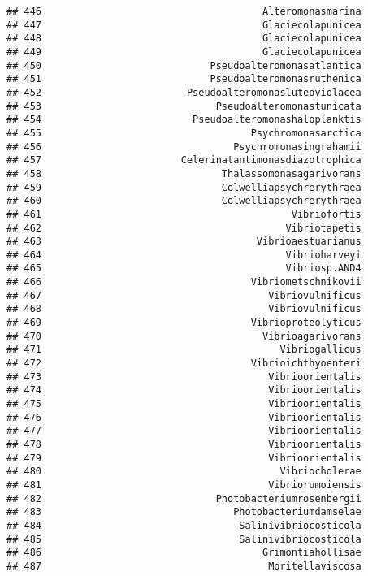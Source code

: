 \documentclass[
]{article}
\begin{document}
\begin{verbatim}
## 446                                      Alteromonasmarina
## 447                                      Glaciecolapunicea
## 448                                      Glaciecolapunicea
## 449                                      Glaciecolapunicea
## 450                             Pseudoalteromonasatlantica
## 451                             Pseudoalteromonasruthenica
## 452                         Pseudoalteromonasluteoviolacea
## 453                              Pseudoalteromonastunicata
## 454                          Pseudoalteromonashaloplanktis
## 455                                    Psychromonasarctica
## 456                                 Psychromonasingrahamii
## 457                        Celerinatantimonasdiazotrophica
## 458                               Thalassomonasagarivorans
## 459                               Colwelliapsychrerythraea
## 460                               Colwelliapsychrerythraea
## 461                                           Vibriofortis
## 462                                          Vibriotapetis
## 463                                     Vibrioaestuarianus
## 464                                          Vibrioharveyi
## 465                                          Vibriosp.AND4
## 466                                    Vibriometschnikovii
## 467                                       Vibriovulnificus
## 468                                       Vibriovulnificus
## 469                                    Vibrioproteolyticus
## 470                                      Vibrioagarivorans
## 471                                         Vibriogallicus
## 472                                    Vibrioichthyoenteri
## 473                                       Vibrioorientalis
## 474                                       Vibrioorientalis
## 475                                       Vibrioorientalis
## 476                                       Vibrioorientalis
## 477                                       Vibrioorientalis
## 478                                       Vibrioorientalis
## 479                                       Vibrioorientalis
## 480                                         Vibriocholerae
## 481                                       Vibriorumoiensis
## 482                              Photobacteriumrosenbergii
## 483                                 Photobacteriumdamselae
## 484                                  Salinivibriocosticola
## 485                                  Salinivibriocosticola
## 486                                      Grimontiahollisae
## 487                                       Moritellaviscosa

\end{verbatim}
\end{document}
